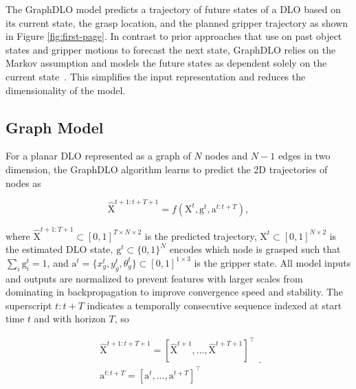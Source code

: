 \documentclass[letterpaper, 10 pt, conference]{IEEETran}
\newcommand{\mat}[1]{\bm{\mathrm{#1}}}
\begin{document}
The GraphDLO model predicts a trajectory of future states of a DLO based on its current state, the grasp location, and the planned gripper trajectory as shown in Figure \ref{fig:first-page}. In contrast to prior approaches that use on past object states and gripper motions to forecast the next state, GraphDLO relies on the Markov assumption and models the future states as dependent solely on the current state~\cite{zhang2024dynamic3dgs, zhang2024adaptigraph}. This simplifies the input representation and reduces the dimensionality of the model.

\subsection{Graph Model}

For a planar DLO represented as a graph of $N$ nodes and $N-1$ edges in two dimension, the GraphDLO algorithm learns to predict the 2D trajectories of nodes as

\begin{equation}
\hat{\mat{X}}^{t+1:t+T+1} = f(\mat{X}^{t}, \mat{g}^{t}, \mat{a}^{t:t+T}),
\end{equation} 

\noindent where $\hat{\mat{X}}^{t+1:T+1} \subset [0, 1] ^{T \times N \times 2}$ is the predicted trajectory, $\mat{X}^{t} \subset [0, 1]^{N \times 2}$ is the estimated DLO state, $\mat{g}^t \subset \{0, 1\}^{N}$ encodes which node is grasped such that $\sum_i \mat{g}_i^t = 1$, and $\mat{a}^t = \{x_g^t, y_g^t, \theta_g^t\} \subset [0, 1]^{1 \times 3}$ is the gripper state. All model inputs and outputs are normalized to prevent features with larger scales from dominating in backpropagation to improve convergence speed and stability. The superscript $t:t+T$ indicates a temporally consecutive sequence indexed at start time $t$ and with horizon $T$, so

\begin{equation}
\begin{matrix}
    \hat{\mat{X}}^{t+1:t+T+1} = \left[\hat{\mat{X}}^{t+1}, \dots, \hat{\mat{X}}^{t+T+1}\right]^{\intercal} \\
    \mat{a}^{t:t+T} = \left[\mat{a}^t, \dots, \mat{a}^{t+T}\right]^{\intercal}
\end{matrix}.
\end{equation}
\end{document}
